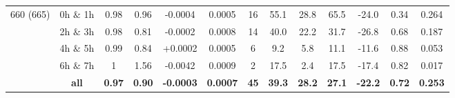 \documentclass[onecolumn,3p,letterpaper,11pt]{elsarticle}
\begin{document}
\begin{table}[htbp!]
\begin{tabular}{ccccccccccccc}
\multirow{5}{*}{660 (665)}  &  0h $\&$ 1h  & 0.98    & 0.96    & -0.0004 & 0.0005      & 16  & 55.1    & 28.8        & 65.5        & -24.0    & 0.34    & 0.264   \\ 
                            &  2h $\&$ 3h  & 0.98    & 0.81    & -0.0002 & 0.0008      & 14  & 40.0    & 22.2        & 31.7        & -26.8    & 0.68    & 0.187   \\ 
                            &  4h $\&$ 5h  & 0.99    & 0.84    & +0.0002 & 0.0005      & 6   &  9.2    &  5.8        & 11.1        & -11.6    & 0.88    & 0.053   \\ 
                            &  6h $\&$ 7h  & 1       & 1.56    & -0.0042 & 0.0009      & 2   & 17.5    &  2.4        & 17.5        & -17.4    & 0.82    & 0.017   \\ 
                              &  \textbf{all}         & \textbf{0.97}    & \textbf{0.90}    & \textbf{-0.0003} & \textbf{0.0007}      & \textbf{45}  & \textbf{39.3}    & \textbf{28.2}        & \textbf{27.1}        & \textbf{-22.2}    & \textbf{0.72}    & \textbf{0.253}   \\ 
\hline 
\end{tabular}
\end{table}
\end{document}
